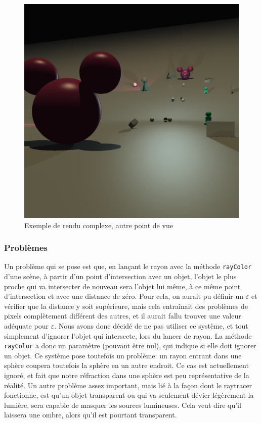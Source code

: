 \documentclass[a4paper]{article}
\begin{document}
    \begin{figure}[p]
      \centerline{
        \includegraphics[width=1.2\textwidth]{0699.png}
      }
      \caption{Exemple de rendu complexe, autre point de vue}
    \end{figure}

    \subsubsection{Problèmes}
    Un problème qui se pose est que, en lançant le rayon avec la méthode \verb+rayColor+ d'une scène,
    à partir d'un point d'intersection avec un objet, l'objet le plus proche qui va intersecter de nouveau
    sera l'objet lui même, à ce même point d'intersection et avec une distance de zéro.
    Pour cela, on aurait pu définir un $\varepsilon$ et vérifier que la distance y soit supérieure, mais
    cela entraînait des problèmes de pixels complètement différent des autres, et il aurait fallu trouver
    une valeur adéquate pour $\varepsilon$. Nous avons donc décidé de ne pas utiliser ce système, et tout
    simplement d'ignorer l'objet qui intersecte, lors du lancer de rayon.
    La méthode \verb+rayColor+ a donc un paramètre (pouvant être nul), qui indique si elle doit ignorer un objet.
    Ce système pose toutefois un problème: un rayon entrant dans une sphère coupera toutefois la sphère en un autre
    endroit. Ce cas est actuellement ignoré, et fait que notre réfraction dans une sphère est peu représentative de la réalité.
    Un autre problème assez important, mais lié à la façon dont le raytracer fonctionne, est qu'un objet transparent ou qui va seulement
    dévier légèrement la lumière, sera capable de masquer les sources lumineuses.
    Cela veut dire qu'il laissera une ombre, alors qu'il est pourtant transparent.
\end{document}

